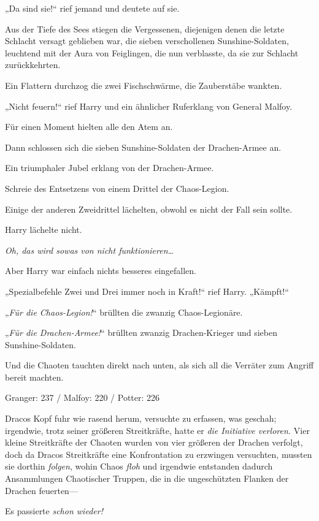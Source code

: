 {„Da sind sie!“ rief jemand und deutete auf sie.

Aus der Tiefe des Sees stiegen die Vergessenen, diejenigen denen die letzte Schlacht versagt geblieben war, die sieben verschollenen Sunshine-Soldaten, leuchtend mit der Aura von Feiglingen, die nun verblasste, da sie zur Schlacht zurückkehrten.

Ein Flattern durchzog die zwei Fischschwärme, die Zauberstäbe wankten.

„Nicht feuern!“ rief Harry und ein ähnlicher Ruferklang von General Malfoy.

Für einen Moment hielten alle den Atem an.

Dann schlossen sich die sieben Sunshine-Soldaten der Drachen-Armee an.

Ein triumphaler Jubel erklang von der Drachen-Armee.

Schreie des Entsetzens von einem Drittel der Chaos-Legion.

Einige der anderen Zweidrittel lächelten, obwohl es nicht der Fall sein sollte.

Harry lächelte nicht.

\emph{Oh, das wird sowas von nicht funktionieren…}

Aber Harry war einfach nichts besseres eingefallen.

„Spezialbefehle Zwei und Drei immer noch in Kraft!“ rief Harry. „Kämpft!“

„\emph{Für die Chaos-Legion!}“ brüllten die zwanzig Chaos-Legionäre.

„\emph{Für die Drachen-Armee!}“ brüllten zwanzig Drachen-Krieger und sieben Sunshine-Soldaten.

Und die Chaoten tauchten direkt nach unten, als sich all die Verräter zum Angriff bereit machten.

\later

Granger: 237 / Malfoy: 220 / Potter: 226

Dracos Kopf fuhr wie rasend herum, versuchte zu erfassen, was geschah; irgendwie, trotz seiner größeren Streitkräfte, hatte er \emph{die Initiative verloren.} Vier kleine Streitkräfte der Chaoten wurden von vier größeren der Drachen verfolgt, doch da Dracos Streitkräfte eine Konfrontation zu erzwingen versuchten, mussten sie dorthin \emph{folgen}, wohin Chaos \emph{floh} und irgendwie entstanden dadurch Ansammlungen Chaotischer Truppen, die in die ungeschützten Flanken der Drachen feuerten—

Es passierte \emph{schon wieder!}

}
